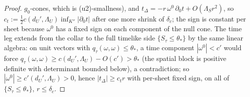 \begin{proof}
$g_0$-cones, which is (u2)-smallness), and
$t_\Delta=-r\,\omega^0\,\partial_0t+O(\Lambda_S r^2)$, so
$c_t:=\tfrac12c(d_U',\Lambda_U)\inf_{K''}|\partial_0 t|$ after one
more shrink of $\delta_c$; the sign is constant per sheet because
$\omega^0$ has a fixed sign on each component of the null cone. The
time leg extends from the collar to the full timelike side
$\{S_\tau\le\theta_*\}$ by the same linear algebra: on unit
vectors with $q_\tau(\omega,\omega)\le\theta_*$, a time component
$|\omega^0|<c'$ would force $q_\tau(\omega,\omega)\ge
c(d_U',\Lambda_U)-O(c')>\theta_*$ (the spatial block is positive
definite with determinant bounded below), a contradiction; so
$|\omega^0|\ge c'(d_U',\Lambda_U)>0$, hence $|t_\Delta|\ge c_t r$
with per-sheet fixed sign, on all of $\{S_\tau\le\theta_*\}$,
$r\le\delta_c$.
\end{proof}

